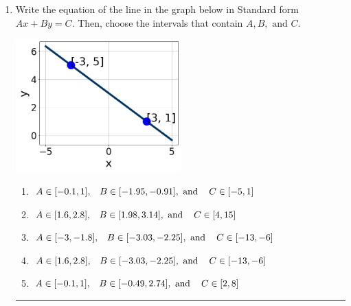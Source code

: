 \documentclass[14pt]{extbook}
\newcommand{\litem}[1]{\item#1\hspace*{-1cm}\rule{\textwidth}{0.4pt}}
\begin{document}
\begin{enumerate}
{\begin{enumerate}[label=\Alph*.]
\end{enumerate} }
\litem{
Write the equation of the line in the graph below in Standard form $Ax+By=C$. Then, choose the intervals that contain $A, B, \text{ and } C$.
\begin{center}
    \includegraphics[width=0.5\textwidth]{../Figures/linearGraphToStandardA.png}
\end{center}
\begin{enumerate}[label=\Alph*.]
\item \( A \in [-0.1, 1], \hspace{3mm} B \in [-1.95, -0.91], \text{ and } \hspace{3mm} C \in [-5, 1] \)
\item \( A \in [1.6, 2.8], \hspace{3mm} B \in [1.98, 3.14], \text{ and } \hspace{3mm} C \in [4, 15] \)
\item \( A \in [-3, -1.8], \hspace{3mm} B \in [-3.03, -2.25], \text{ and } \hspace{3mm} C \in [-13, -6] \)
\item \( A \in [1.6, 2.8], \hspace{3mm} B \in [-3.03, -2.25], \text{ and } \hspace{3mm} C \in [-13, -6] \)
\item \( A \in [-0.1, 1], \hspace{3mm} B \in [-0.49, 2.74], \text{ and } \hspace{3mm} C \in [2, 8] \)

\end{enumerate} }
\end{enumerate}
\end{document}
